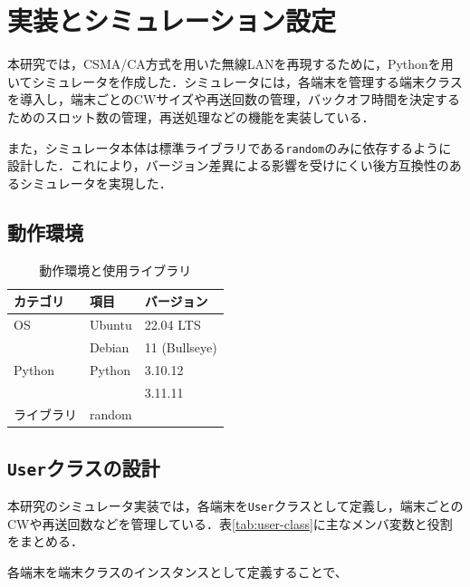 \documentclass[a4paper,10pt]{ltjsarticle}
\begin{document}
\clearpage
\section{実装とシミュレーション設定}

本研究では，CSMA/CA方式を用いた無線LANを再現するために，Pythonを用いてシミュレータを作成した．シミュレータには，各端末を管理する端末クラスを導入し，端末ごとのCWサイズや再送回数の管理，バックオフ時間を決定するためのスロット数の管理，再送処理などの機能を実装している．

また，シミュレータ本体は標準ライブラリである\texttt{random}のみに依存するように設計した．これにより，バージョン差異による影響を受けにくい後方互換性のあるシミュレータを実現した．


\subsection{動作環境}

\begin{table}[h]
  \centering
  \caption{動作環境と使用ライブラリ}
  \label{tab:env}
  \begin{tabular}{lll}
      \hline
      \textbf{カテゴリ} & \textbf{項目} & \textbf{バージョン} \\ \hline
      OS               & Ubuntu        & 22.04 LTS \\ 
                       & Debian        & 11 (Bullseye) \\ \hline
      Python           & Python        & 3.10.12 \\ 
                        &               & 3.11.11 \\ \hline
      ライブラリ       & random         & \\ \hline
  \end{tabular}
\end{table}







\subsection{\texttt{User}クラスの設計}
本研究のシミュレータ実装では，各端末を\texttt{User}クラスとして定義し，端末ごとのCWや再送回数などを管理している．表\ref{tab:user-class}に主なメンバ変数と役割をまとめる．

各端末を端末クラスのインスタンスとして定義することで、
\end{document}

